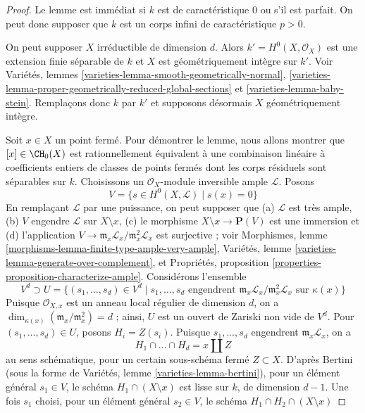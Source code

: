 \begin{proof}
Le lemme est immédiat si $k$ est de caractéristique $0$ ou s'il est parfait.
On peut donc supposer que $k$ est un corps infini de caractéristique $p > 0$.

\medskip\noindent
On peut supposer $X$ irréductible de dimension $d$.
Alors $k' = H^0(X, \mathcal{O}_X)$ est une extension finie séparable
de $k$ et $X$ est géométriquement intègre sur $k'$.
Voir Variétés, lemmes \ref{varieties-lemma-smooth-geometrically-normal},
\ref{varieties-lemma-proper-geometrically-reduced-global-sections} et
\ref{varieties-lemma-baby-stein}. Remplaçons donc $k$ par $k'$
et supposons désormais $X$ géométriquement intègre.

\medskip\noindent
Soit $x \in X$ un point fermé. Pour démontrer le lemme, nous allons montrer que
$[x] \in \CH_0(X)$ est rationnellement équivalent à une combinaison linéaire
à coefficients entiers de classes de points fermés dont les corps résiduels
sont séparables sur $k$. Choisissons un
$\mathcal{O}_X$-module inversible ample $\mathcal{L}$. Posons
$$
V = \{s \in H^0(X, \mathcal{L}) \mid s(x) = 0 \}
$$
En remplaçant $\mathcal{L}$ par une puissance, on peut supposer
que (a) $\mathcal{L}$ est très ample, (b) $V$ engendre
$\mathcal{L}$ sur $X \setminus x$, (c) le morphisme
$X \setminus x \to \mathbf{P}(V)$ est une immersion et (d)
l'application $V \to \mathfrak m_x\mathcal{L}_x/\mathfrak m_x^2\mathcal{L}_x$
est surjective ; voir
Morphismes, lemme \ref{morphisms-lemma-finite-type-ample-very-ample},
Variétés, lemme \ref{varieties-lemma-generate-over-complement}, et
Propriétés, proposition \ref{properties-proposition-characterize-ample}.
Considérons l'ensemble
$$
V^d \supset U =
\{
(s_1, \ldots, s_d) \in V^d \mid s_1, \ldots, s_d
\text{ engendrent }
\mathfrak m_x\mathcal{L}_x/\mathfrak m_x^2\mathcal{L}_x
\text{ sur }\kappa(x)
\}
$$
Puisque $\mathcal{O}_{X, x}$ est un anneau local régulier de dimension $d$,
on a $\dim_{\kappa(x)}(\mathfrak m_x/\mathfrak m_x^2) = d$ ;
ainsi, $U$ est un ouvert de Zariski non vide de $V^d$.
Pour $(s_1, \ldots, s_d) \in U$, posons $H_i = Z(s_i)$. Puisque
$s_1, \ldots, s_d$ engendrent $\mathfrak m_x\mathcal{L}_x$,
on a
$$
H_1 \cap \ldots \cap H_d = x \amalg Z
$$
au sens schématique, pour un certain sous-schéma fermé $Z \subset X$.
D'après Bertini (sous la forme de Variétés, lemme \ref{varieties-lemma-bertini}),
pour un élément général $s_1 \in V$, le schéma $H_1 \cap (X \setminus x)$
est lisse sur $k$, de dimension $d - 1$.
Une fois $s_1$ choisi, pour un élément général
$s_2 \in V$, le schéma $H_1 \cap H_2 \cap (X \setminus x)$

\end{proof}
